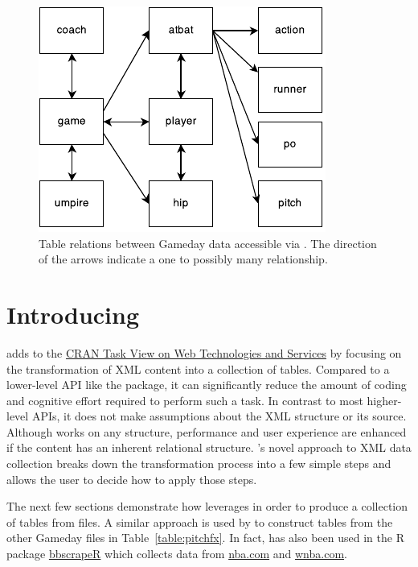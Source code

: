 \begin{article}
\begin{figure}
\centerline{\includegraphics[scale = 1.25]{Drawing1.pdf}}

\caption{Table relations between Gameday data accessible via .
The direction of the arrows indicate a one to possibly many relationship.
\label{fig:relations}}


\end{figure}



\section[Introducing XML2R]{Introducing }

 adds to the \href{http://cran.r-project.org/web/views/WebTechnologies.html}{CRAN Task View on Web Technologies and Services}
by focusing on the transformation of XML content into a collection
of tables. Compared to a lower-level API like the  package,
it can significantly reduce the amount of coding and cognitive effort
required to perform such a task. In contrast to most higher-level
APIs, it does not make assumptions about the XML structure or its
source. Although  works on any structure, performance
and user experience are enhanced if the content has an inherent relational
structure. 's novel approach to XML data collection breaks
down the transformation process into a few simple steps and allows
the user to decide how to apply those steps.

The next few sections demonstrate how  leverages 
in order to produce a collection of tables from 
files. A similar approach is used by  to construct
tables from the other Gameday files in Table~\ref{table:pitchfx}.
In fact,  has also been used in the R package \href{https://github.com/cpsievert/bbscrapeR}{bbscrapeR}
which collects data from \href{http://nba.com}{nba.com} and \href{http://wnba.com}{wnba.com}.



\end{article}
